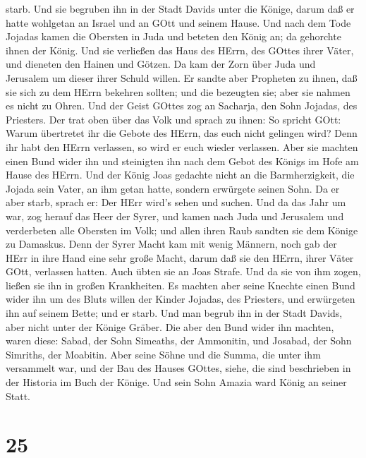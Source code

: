 starb.  Und sie begruben ihn in der Stadt Davids unter die
Könige, darum daß er hatte wohlgetan an Israel und an GOtt und seinem
Hause.  Und nach dem Tode Jojadas kamen die Obersten in
Juda und beteten den König an; da gehorchte ihnen der König.
 Und sie verließen das Haus des HErrn, des GOttes ihrer
Väter, und dieneten den Hainen und Götzen. Da kam der Zorn über Juda und
Jerusalem um dieser ihrer Schuld willen.  Er sandte aber
Propheten zu ihnen, daß sie sich zu dem HErrn bekehren sollten; und die
bezeugten sie; aber sie nahmen es nicht zu Ohren.  Und der
Geist GOttes zog an Sacharja, den Sohn Jojadas, des Priesters. Der trat
oben über das Volk und sprach zu ihnen: So spricht GOtt: Warum
übertretet ihr die Gebote des HErrn, das euch nicht gelingen wird? Denn
ihr habt den HErrn verlassen, so wird er euch wieder verlassen.
 Aber sie machten einen Bund wider ihn und steinigten ihn
nach dem Gebot des Königs im Hofe am Hause des HErrn.  Und
der König Joas gedachte nicht an die Barmherzigkeit, die Jojada sein
Vater, an ihm getan hatte, sondern erwürgete seinen Sohn. Da er aber
starb, sprach er: Der HErr wird's sehen und suchen.  Und da
das Jahr um war, zog herauf das Heer der Syrer, und kamen nach Juda und
Jerusalem und verderbeten alle Obersten im Volk; und allen ihren Raub
sandten sie dem Könige zu Damaskus.  Denn der Syrer Macht
kam mit wenig Männern, noch gab der HErr in ihre Hand eine sehr große
Macht, darum daß sie den HErrn, ihrer Väter GOtt, verlassen hatten. Auch
übten sie an Joas Strafe.  Und da sie von ihm zogen, ließen
sie ihn in großen Krankheiten. Es machten aber seine Knechte einen Bund
wider ihn um des Bluts willen der Kinder Jojadas, des Priesters, und
erwürgeten ihn auf seinem Bette; und er starb. Und man begrub ihn in der
Stadt Davids, aber nicht unter der Könige Gräber.  Die aber
den Bund wider ihn machten, waren diese: Sabad, der Sohn Simeaths, der
Ammonitin, und Josabad, der Sohn Simriths, der Moabitin. 
Aber seine Söhne und die Summa, die unter ihm versammelt war, und der
Bau des Hauses GOttes, siehe, die sind beschrieben in der Historia im
Buch der Könige. Und sein Sohn Amazia ward König an seiner Statt.

\hypertarget{section-24}{%
\section{25}\label{section-24}}

